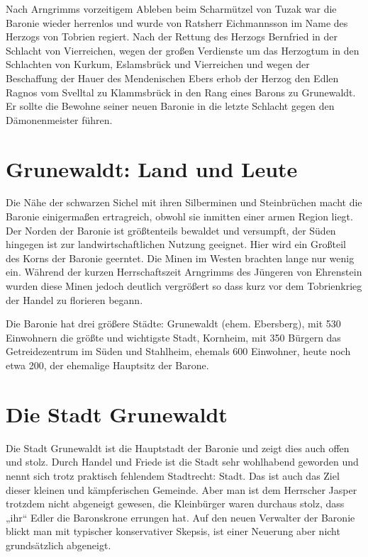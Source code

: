 Nach Arngrimms vorzeitigem Ableben beim Scharmützel von Tuzak war die Baronie wieder herrenlos und wurde von Ratsherr Eichmannsson im Name des Herzogs von Tobrien regiert. Nach der Rettung des Herzogs Bernfried in der Schlacht von Vierreichen, wegen der großen Verdienste um das Herzogtum in den Schlachten von Kurkum, Eslamsbrück und Vierreichen und wegen der Beschaffung der Hauer des Mendenischen Ebers erhob der Herzog den Edlen Ragnos vom Svelltal zu Klammsbrück in den Rang eines Barons zu Grunewaldt. Er sollte die Bewohne seiner neuen Baronie in die letzte Schlacht gegen den Dämonenmeister führen.

\section{Grunewaldt: Land und Leute}

Die Nähe der schwarzen Sichel mit ihren Silberminen und Steinbrüchen macht die Baronie einigermaßen ertragreich, obwohl sie inmitten einer armen Region liegt. Der Norden der Baronie ist größtenteils bewaldet und versumpft, der Süden hingegen ist zur landwirtschaftlichen Nutzung geeignet. Hier wird ein Großteil des Korns der Baronie geerntet. Die Minen im Westen brachten lange nur wenig ein. Während der kurzen Herrschaftszeit Arngrimms des Jüngeren von Ehrenstein wurden diese Minen jedoch deutlich vergrößert so dass kurz vor dem Tobrienkrieg der Handel zu florieren begann. 

Die Baronie hat drei größere Städte: Grunewaldt (ehem. Ebersberg), mit 530 Einwohnern die größte und wichtigste Stadt, Kornheim, mit 350 Bürgern das Getreidezentrum im Süden und Stahlheim, ehemals 600 Einwohner, heute noch etwa 200, der ehemalige Hauptsitz der Barone.

\section{Die Stadt Grunewaldt}
Die Stadt Grunewaldt ist die Hauptstadt der Baronie und zeigt dies auch offen und stolz. Durch Handel und Friede ist die Stadt sehr wohlhabend geworden und nennt sich trotz praktisch fehlendem Stadtrecht: Stadt. Das ist auch das Ziel dieser kleinen und kämpferischen Gemeinde. Aber man ist dem Herrscher Jasper trotzdem nicht abgeneigt gewesen, die Kleinbürger waren durchaus stolz, dass „ihr“ Edler die Baronskrone errungen hat. Auf den neuen Verwalter der Baronie blickt man mit typischer konservativer Skepsis, ist einer Neuerung aber nicht grundsätzlich abgeneigt.

